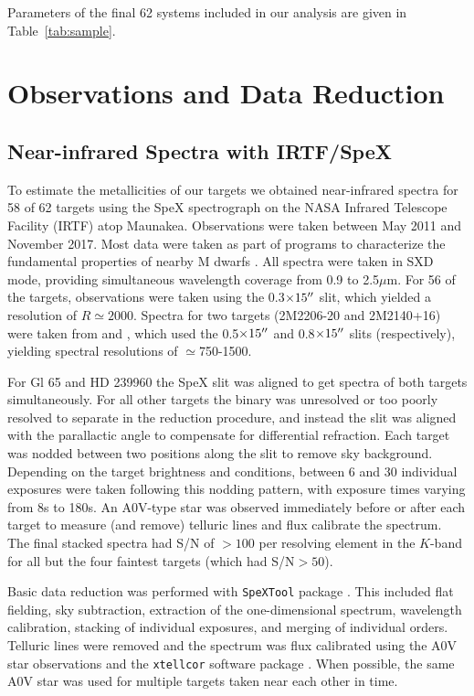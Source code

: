 \documentclass[twocolumn]{aastex62}
\begin{document}
Parameters of the final 62 systems included in our analysis are given in Table~\ref{tab:sample}.

\section{Observations and Data Reduction}\label{sec:obs} 

\subsection{Near-infrared Spectra with IRTF/SpeX}

To estimate the metallicities of our targets we obtained near-infrared spectra for 58 of 62 targets using the SpeX spectrograph \citep{Rayner:2003} on the NASA Infrared Telescope Facility (IRTF) atop Maunakea. Observations were taken between May 2011 and November 2017. Most data were taken as part of programs to characterize the fundamental properties of nearby M dwarfs \citep[e.g.,][]{Mann2013c,Gaidos2014,Terrien2015}. All spectra were taken in SXD mode, providing simultaneous wavelength coverage from 0.9 to 2.5$\mu$m. For 56 of the targets, observations were taken using the 0.3$\times15\mbox{$^{\prime\prime}$}$ slit, which yielded a resolution of $R\simeq2000$. Spectra for two targets (2M2206-20 and 2M2140+16) were taken from \citet{2009ApJ...706..328D} and \citet{Dupuy2012}, which used the 0.5$\times15\mbox{$^{\prime\prime}$}$ and 0.8$\times15\mbox{$^{\prime\prime}$}$ slits (respectively), yielding spectral resolutions of $\simeq$750-1500. 

For Gl 65 and HD 239960 the SpeX slit was aligned to get spectra of both targets simultaneously. For all other targets the binary was unresolved or too poorly resolved to separate in the reduction procedure, and instead the slit was aligned with the parallactic angle to compensate for differential refraction. Each target was nodded between two positions along the slit to remove sky background. Depending on the target brightness and conditions, between 6 and 30 individual exposures were taken following this nodding pattern, with exposure times varying from 8s to 180s. An A0V-type star was observed immediately before or after each target to measure (and remove) telluric lines and flux calibrate the spectrum. The final stacked spectra had S/N of $>100$ per resolving element in the $K$-band for all but the four faintest targets (which had S/N$>50$). 

Basic data reduction was performed with {\tt SpeXTool} package \citep{Cushing2004}. This included flat fielding, sky subtraction, extraction of the one-dimensional spectrum, wavelength calibration, stacking of individual exposures, and merging of individual orders. Telluric lines were removed and the spectrum was flux calibrated using the A0V star observations and the {\tt xtellcor} software package \citep{Vacca2003}. When possible, the same A0V star was used for multiple targets taken near each other in time. 
\end{document}
